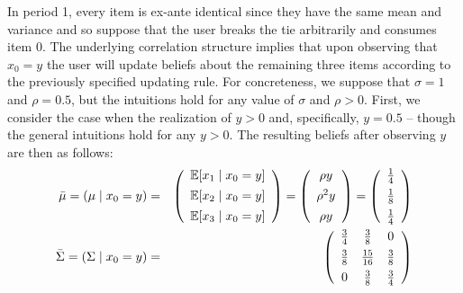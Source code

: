 \documentclass[sigconf]{acmart}
\begin{document}
In period 1, every item is ex-ante identical since they have the same mean and variance and so suppose that the user breaks the tie arbitrarily and consumes item 0. The underlying correlation structure implies that upon observing that $x_0 = y$ the user will update beliefs about the remaining three items according to the previously specified updating rule. For concreteness, we suppose that $\sigma = 1$ and $\rho = 0.5$, but the intuitions hold for any value of $\sigma$ and $\rho > 0$. First, we consider the case when the realization of $y > 0$ and, specifically, $y = 0.5$ -- though the general intuitions hold for any $y > 0$. The resulting beliefs after observing $y$ are then as follows:
\begin{eqnarray*} \bar{\mu} = (\mu \mid x_0=y)& =&  \left (\begin{array}{c}
\mathbb{E}[x_1\mid x_0=y] \vspace{0.15cm} \\
\mathbb{E}[x_2\mid x_0=y] \vspace{0.15cm} \\
\mathbb{E}[x_3\mid x_0=y]
\end{array}  \right) =\left (\begin{array}{c}
\rho y  \vspace{0.15cm} \\
\rho^{2} y  \vspace{0.15cm} \\
 \rho y \\
\end{array} \right) =
\left (\begin{array}{c}
\frac{1}{4} \vspace{0.15cm} \\
\frac{1}{8}  \vspace{0.15cm} \\
\frac{1}{4}
\end{array}  \right)\\
\bar{\Sigma} =(\Sigma\mid x_0=y)&=&  \left( \begin{array}{ccc}
\frac{3}{4} & \frac{3}{8} & 0 \vspace{0.15cm} \\
\frac{3}{8} & \frac{15}{16} & \frac{3}{8} \vspace{0.15cm}  \\
0 &\frac{3}{8} & \frac{3}{4}  \\
\end{array} \right)
\end{eqnarray*}
\end{document}
